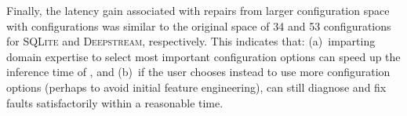 Finally, the latency gain associated with repairs from larger configuration space with configurations was similar to the original space of 34 and 53 configurations for \textsc{SQLite} and \textsc{Deepstream}, respectively. This indicates that: (a)~imparting domain expertise to select most important configuration options can speed up the inference time of \ourapproach, and (b)~if the user chooses instead to use more configuration options (perhaps to avoid initial feature engineering), \ourapproach can still diagnose and fix faults satisfactorily within a reasonable time. 